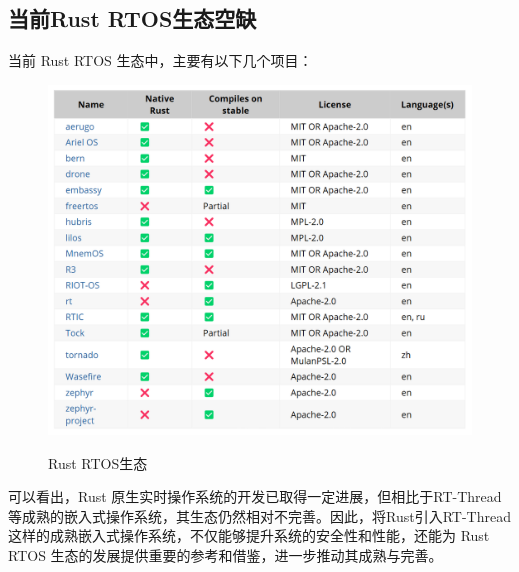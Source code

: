\subsection{当前Rust RTOS生态空缺}
当前 Rust RTOS 生态中，主要有以下几个项目：
\begin{figure}[htpb]
    \centering
    \caption{Rust RTOS生态\cite{AreWeRTOSYet}}
    \includegraphics[width=0.5\linewidth]{img/Rust RTOS.png}
    \label{fig2}
\end{figure}

\indent 可以看出，Rust 原生实时操作系统的开发已取得一定进展，但相比于RT-Thread等成熟的嵌入式操作系统，其生态仍然相对不完善。因此，将Rust引入RT-Thread这样的成熟嵌入式操作系统，不仅能够提升系统的安全性和性能，还能为 Rust RTOS 生态的发展提供重要的参考和借鉴，进一步推动其成熟与完善。